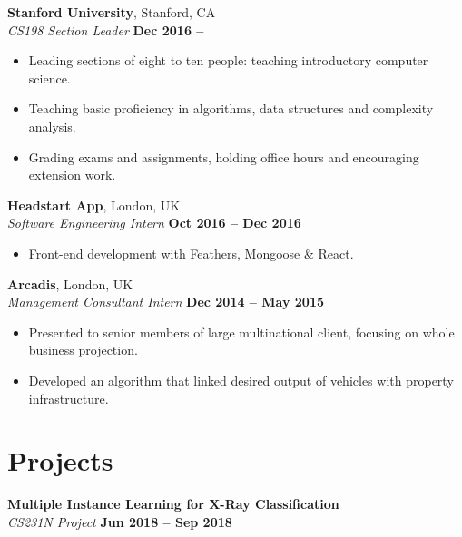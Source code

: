 \documentclass[margin,line]{resume-template}
\begin{document}
\begin{resume}
    \textbf{Stanford University}, Stanford, CA \vspace{2mm}\\\vspace{1mm}%
    \textsl{CS198 Section Leader} \hfill \textbf{Dec 2016 --}
    \begin{itemize}
 	\item Leading sections of eight to ten people: teaching introductory computer science.
    \item Teaching basic proficiency in algorithms, data structures and complexity analysis.
	\item Grading exams and assignments, holding office hours and encouraging extension work.
    \end{itemize}

    \textbf{Headstart App}, London, UK \vspace{2mm}\\\vspace{1mm}%
    \textsl{Software Engineering Intern} \hfill \textbf{Oct 2016 -- Dec 2016}
    \begin{itemize}
    \item Front-end development with Feathers, Mongoose \& React.
    \end{itemize}

    \textbf{Arcadis}, London, UK \vspace{2mm}\\\vspace{1mm}%
    \textsl{Management Consultant Intern} \hfill \textbf{Dec 2014 -- May 2015}
    \begin{itemize}
        \item Presented to senior members of large multinational client, focusing on whole business projection.
        \item Developed an algorithm that linked desired output of vehicles with property infrastructure.
    \end{itemize}

   \section{\mysidestyle Projects}
   
   \textbf{Multiple Instance Learning for X-Ray Classification} \vspace{2mm}\\\vspace{1mm}%
   	\textsl{CS231N Project} \hfill \textbf{Jun 2018 -- Sep 2018}
   

\end{resume}
\end{document}
